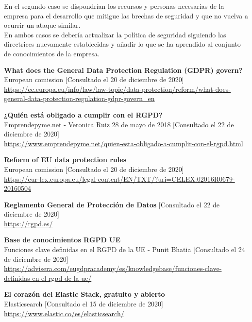 \documentclass[a4paper,oneside]{article}
\begin{document}
En el segundo caso se dispondrían los recursos y personas necesarias de la empresa para el desarrollo que mitigue las brechas de seguridad y que no vuelva a ocurrir un ataque similar.\\

En ambos casos se debería actualizar la política de seguridad siguiendo las directrices nuevamente establecidas y añadir lo que se ha aprendido al conjunto de conocimientos de la empresa.

\newpage
\begin{thebibliography}{9}

	\textbf{What does the General Data Protection Regulation (GDPR) govern?}\\
	European comission [Consultado el 20 de diciembre de 2020]\\
	\url{https://ec.europa.eu/info/law/law-topic/data-protection/reform/what-does-general-data-protection-regulation-gdpr-govern_en}

	\textbf{¿Quién está obligado a cumplir con el RGPD?}\\
	Emprendepyme.net - Veronica Ruiz 28 de mayo de 2018 [Consultado el 22 de diciembre de 2020]\\
	\url{https://www.emprendepyme.net/quien-esta-obligado-a-cumplir-con-el-rgpd.html}

	\textbf{Reform of EU data protection rules}\\
	European comission [Consultado el 20 de diciembre de 2020]\\
	\url{https://eur-lex.europa.eu/legal-content/EN/TXT/?uri=CELEX:02016R0679-20160504}

	\textbf{Reglamento General de Protección de Datos} [Consultado el 22 de diciembre de 2020]\\
	\url{https://rgpd.es/}

	\textbf{Base de conocimientos RGPD UE}\\
	Funciones clave definidas en el RGPD de la UE - Punit Bhatia [Consultado el 24 de diciembre de 2020]\\
	\url{https://advisera.com/eugdpracademy/es/knowledgebase/funciones-clave-definidas-en-el-rgpd-de-la-ue/}

	\textbf{El corazón del Elastic Stack, gratuito y abierto}\\
	Elasticsearch [Consultado el 15 de diciembre de 2020]\\
	\url{https://www.elastic.co/es/elasticsearch/}


\end{thebibliography}
\end{document}
